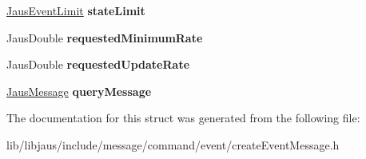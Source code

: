 \begin{DoxyCompactItemize}
\item 
\hypertarget{struct_create_event_message_struct_a65a5803a3b08dd2f13e7287013cab75b}{\hyperlink{struct_jaus_event_limit_struct}{\-Jaus\-Event\-Limit} {\bfseries state\-Limit}}\label{struct_create_event_message_struct_a65a5803a3b08dd2f13e7287013cab75b}

\item 
\hypertarget{struct_create_event_message_struct_a18b2d5617ebfe2680cf163970f650382}{\-Jaus\-Double {\bfseries requested\-Minimum\-Rate}}\label{struct_create_event_message_struct_a18b2d5617ebfe2680cf163970f650382}

\item 
\hypertarget{struct_create_event_message_struct_a4bc8d73bad7b1ac5f5bd56c6cd373dfb}{\-Jaus\-Double {\bfseries requested\-Update\-Rate}}\label{struct_create_event_message_struct_a4bc8d73bad7b1ac5f5bd56c6cd373dfb}

\item 
\hypertarget{struct_create_event_message_struct_ab22171bd5871b485fe0347e7955942e6}{\hyperlink{struct_jaus_message_struct}{\-Jaus\-Message} {\bfseries query\-Message}}\label{struct_create_event_message_struct_ab22171bd5871b485fe0347e7955942e6}

\end{DoxyCompactItemize}


\-The documentation for this struct was generated from the following file\-:\begin{DoxyCompactItemize}
\item 
lib/libjaus/include/message/command/event/create\-Event\-Message.\-h\end{DoxyCompactItemize}
